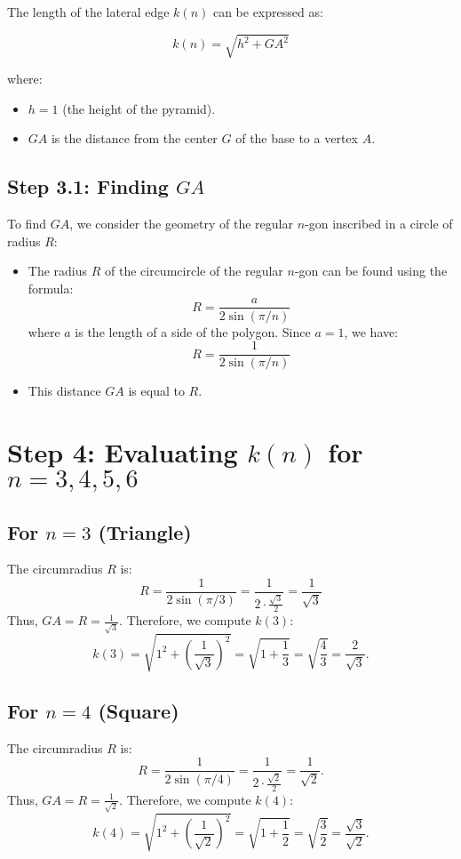 \documentclass{article}
\begin{document}
The length of the lateral edge \( k(n) \) can be expressed as:

\[
k(n) = \sqrt{h^2 + GA^2}
\]

where:
\begin{itemize}
    \item \( h = 1 \) (the height of the pyramid).
    \item \( GA \) is the distance from the center \( G \) of the base to a vertex \( A \).
\end{itemize}

\subsection*{Step 3.1: Finding \( GA \)}

To find \( GA \), we consider the geometry of the regular \( n \)-gon inscribed in a circle of radius \( R \):

\begin{itemize}
    \item The radius \( R \) of the circumcircle of the regular \( n \)-gon can be found using the formula:
    \[
    R = \frac{a}{2 \sin(\pi/n)}
    \]
    where \( a \) is the length of a side of the polygon. Since \( a = 1 \), we have:
    \[
    R = \frac{1}{2 \sin(\pi/n)}
    \]
    \item This distance \( GA \) is equal to \( R \).
\end{itemize}

\section*{Step 4: Evaluating \( k(n) \) for \( n = 3, 4, 5, 6 \)}

\subsection*{For \( n = 3 \) (Triangle)}
The circumradius \( R \) is:
\[
R = \frac{1}{2 \sin(\pi/3)} = \frac{1}{2 \cdot \frac{\sqrt{3}}{2}} = \frac{1}{\sqrt{3}}
\]
Thus, \( GA = R = \frac{1}{\sqrt{3}} \). Therefore, we compute \( k(3) \):
\[
k(3) = \sqrt{1^2 + \left(\frac{1}{\sqrt{3}}\right)^2} = \sqrt{1 + \frac{1}{3}} = \sqrt{\frac{4}{3}} = \frac{2}{\sqrt{3}}.
\]

\subsection*{For \( n = 4 \) (Square)}
The circumradius \( R \) is:
\[
R = \frac{1}{2 \sin(\pi/4)} = \frac{1}{2 \cdot \frac{\sqrt{2}}{2}} = \frac{1}{\sqrt{2}}.
\]
Thus, \( GA = R = \frac{1}{\sqrt{2}} \). Therefore, we compute \( k(4) \):
\[
k(4) = \sqrt{1^2 + \left(\frac{1}{\sqrt{2}}\right)^2} = \sqrt{1 + \frac{1}{2}} = \sqrt{\frac{3}{2}} = \frac{\sqrt{3}}{\sqrt{2}}.
\]
\end{document}
